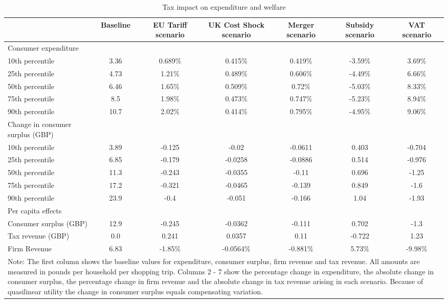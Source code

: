 \documentclass[11pt]{article}
\begin{document}
\begin{table}[h]
\caption{Tax impact on expenditure and welfare}
\label{table:tax impact welfare}
\begin{center}
\begin{tabular}{lcccccc} \hline \hline
 & Baseline &EU Tariff scenario &UK Cost Shock scenario &Merger scenario &Subsidy scenario &VAT scenario \\ \hline
Consumer expenditure & & & & & & \\
10th percentile &3.36 &0.689\% &0.415\% &0.419\% &-3.59\% &3.69\% \\
25th percentile &4.73 &1.21\% &0.489\% &0.606\% &-4.49\% &6.66\% \\
50th percentile &6.46 &1.65\% &0.509\% &0.72\% &-5.03\% &8.33\% \\
75th percentile &8.5 &1.98\% &0.473\% &0.747\% &-5.23\% &8.94\% \\
90th percentile &10.7 &2.02\% &0.414\% &0.795\% &-4.95\% &9.06\% \\
\hline 
Change in consumer surplus (GBP) & & & & & & \\
10th percentile &3.89 &-0.125 &-0.02 &-0.0611 &0.403 &-0.704 \\
25th percentile &6.85 &-0.179 &-0.0258 &-0.0886 &0.514 &-0.976 \\
50th percentile &11.3 &-0.243 &-0.0355 &-0.11 &0.696 &-1.25 \\
75th percentile &17.2 &-0.321 &-0.0465 &-0.139 &0.849 &-1.6 \\
90th percentile &23.9 &-0.4 &-0.051 &-0.166 &1.04 &-1.93 \\
\hline 
Per capita effects & & & & & & \\
Consumer surplus (GBP) & 12.9 &-0.245 &-0.0362 &-0.111 &0.702 &-1.3 \\
Tax revenue (GBP) & 0.0 &0.241 &0.0357 &0.11 &-0.722 &1.23 \\
Firm Revenue & 6.83 &-1.85\% &-0.0564\% &-0.881\% &5.73\% &-9.98\% \\
 \hline \hline
\multicolumn{7}{p{0.8 \textwidth}}{Note: The first column shows the baseline values for expenditure, consumer surplus, firm revenue and tax revenue. All amounts are measured in pounds per household per shopping trip. Columns 2 - 7 show the percentage change in expenditure, the absolute change in consumer surplus, the percentage change in firm revenue and the absolute change in tax revenue arising in each scenario. Because of quasilinear utility the change in consumer surplus equals compensating variation.}
\end{tabular}
\end{center}
\end{table}
\end{document}
